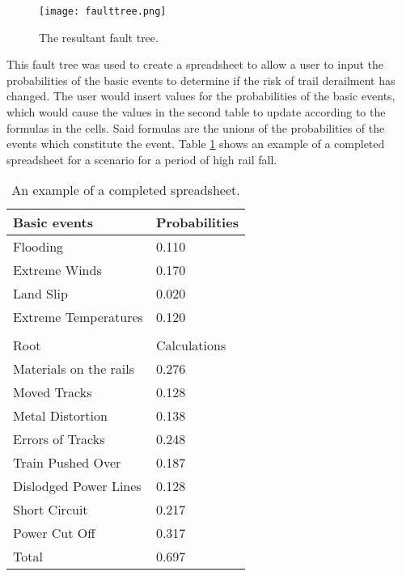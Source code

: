 \documentclass[11pt,a4]{article}
\begin{document}
\begin{figure}[h]
	\begin{sideways}
		\texttt{[image: faulttree.png]}
	\end{sideways}
	\caption{The resultant fault tree.}
	\label{fig:tool}
\end{figure}

This fault tree was used to create a spreadsheet to allow a user to input the
probabilities of the basic events to determine if the risk of trail derailment has
changed.
The user would insert values for the probabilities of the basic events, which would cause
the values in the second table to update according to the formulas in the cells.
Said formulas are the unions of the probabilities of the events which constitute the
event.
Table \ref{tab:spread} shows an example of a completed spreadsheet for a scenario for
a period of high rail fall.

\begin{table}[h]
	\centering
	\begin{tabular}{|l|l|}
		\hline
		Basic events & Probabilities \\ \hline
		Flooding & 0.110 \\ \hline
		Extreme Winds & 0.170 \\ \hline
		Land Slip & 0.020 \\ \hline
		Extreme Temperatures & 0.120 \\ \hline
		 &  \\ \hline
		Root & Calculations \\ \hline
		Materials on the rails & 0.276 \\ \hline
		Moved Tracks & 0.128 \\ \hline
		Metal Distortion & 0.138 \\ \hline
		Errors of Tracks & 0.248 \\ \hline
		Train Pushed Over & 0.187 \\ \hline
		Dislodged Power Lines & 0.128 \\ \hline
		Short Circuit & 0.217 \\ \hline
		Power Cut Off & 0.317 \\ \hline
		Total & 0.697 \\ \hline
	\end{tabular}
	\caption{An example of a completed spreadsheet.}
	\label{tab:spread}
\end{table}

\FloatBarrier
\end{document}
